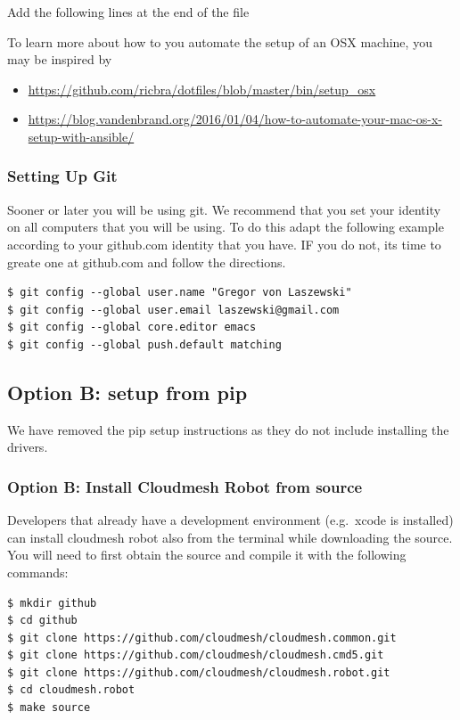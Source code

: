 Add the following lines at the end of the file

To learn more about how to you automate the setup of an OSX machine, you
may be inspired by

\begin{itemize}
\tightlist
\item
  \url{https://github.com/ricbra/dotfiles/blob/master/bin/setup_osx}
\item
  \url{https://blog.vandenbrand.org/2016/01/04/how-to-automate-your-mac-os-x-setup-with-ansible/}
\end{itemize}

\subsubsection{Setting Up Git}\label{setting-up-git}

Sooner or later you will be using git. We recommend that you set your
identity on all computers that you will be using. To do this adapt the
following example according to your github.com identity that you have.
IF you do not, its time to greate one at github.com and follow the
directions.

\begin{verbatim}
$ git config --global user.name "Gregor von Laszewski"
$ git config --global user.email laszewski@gmail.com
$ git config --global core.editor emacs
$ git config --global push.default matching
\end{verbatim}

\subsection{Option B: setup from pip}\label{option-b-setup-from-pip}

We have removed the pip setup instructions as they do not include
installing the drivers.

\subsubsection{Option B: Install Cloudmesh Robot from
source}\label{option-b-install-cloudmesh-robot-from-source}

Developers that already have a development environment (e.g.~xcode is
installed) can install cloudmesh robot also from the terminal while
downloading the source. You will need to first obtain the source and
compile it with the following commands:

\begin{verbatim}
$ mkdir github
$ cd github
$ git clone https://github.com/cloudmesh/cloudmesh.common.git
$ git clone https://github.com/cloudmesh/cloudmesh.cmd5.git
$ git clone https://github.com/cloudmesh/cloudmesh.robot.git
$ cd cloudmesh.robot
$ make source
\end{verbatim}

